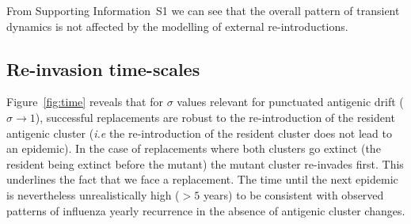 From Supporting Information~S1 we can see that the overall pattern
of transient dynamics is not affected by the modelling of external
re-introductions.

\subsection{Re-invasion time-scales}

Figure~\ref{fig:time} reveals that for $\sigma$ values relevant for
punctuated antigenic drift ($\sigma \to 1$), successful replacements
are robust to the re-introduction of the resident antigenic cluster
(\textit{i.e} the re-introduction of the resident cluster does not
lead to an epidemic). In the case of replacements where both clusters
go extinct (the resident being extinct before the mutant) the mutant
cluster re-invades first. This underlines the fact that we face a
replacement. The time until the next epidemic is nevertheless
unrealistically high ($>5$ years) to be consistent with observed
patterns of influenza yearly recurrence in the absence of antigenic
cluster changes.


